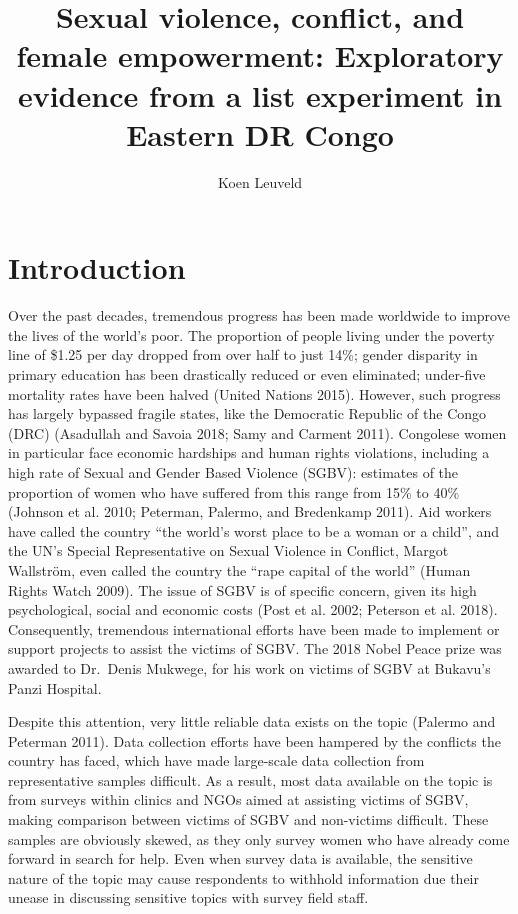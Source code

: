 \documentclass[
]{article}
\title{Sexual violence, conflict, and female empowerment: Exploratory
evidence from a list experiment in Eastern DR Congo}
\author{Koen Leuveld}
\date{}
\begin{document}
\maketitle

\section*{Introduction}\label{introduction}

Over the past decades, tremendous progress has been made worldwide to
improve the lives of the world's poor. The proportion of people living
under the poverty line of \$1.25 per day dropped from over half to just
14\%; gender disparity in primary education has been drastically reduced
or even eliminated; under-five mortality rates have been halved (United
Nations 2015). However, such progress has largely bypassed fragile
states, like the Democratic Republic of the Congo (DRC) (Asadullah and
Savoia 2018; Samy and Carment 2011). Congolese women in particular face
economic hardships and human rights violations, including a high rate of
Sexual and Gender Based Violence (SGBV): estimates of the proportion of
women who have suffered from this range from 15\% to 40\% (Johnson et
al. 2010; Peterman, Palermo, and Bredenkamp 2011). Aid workers have
called the country ``the world's worst place to be a woman or a child'',
and the UN's Special Representative on Sexual Violence in Conflict,
Margot Wallström, even called the country the ``rape capital of the
world'' (Human Rights Watch 2009). The issue of SGBV is of specific
concern, given its high psychological, social and economic costs (Post
et al. 2002; Peterson et al. 2018). Consequently, tremendous
international efforts have been made to implement or support projects to
assist the victims of SGBV. The 2018 Nobel Peace prize was awarded to
Dr.~Denis Mukwege, for his work on victims of SGBV at Bukavu's Panzi
Hospital.

Despite this attention, very little reliable data exists on the topic
(Palermo and Peterman 2011). Data collection efforts have been hampered
by the conflicts the country has faced, which have made large-scale data
collection from representative samples difficult. As a result, most data
available on the topic is from surveys within clinics and NGOs aimed at
assisting victims of SGBV, making comparison between victims of SGBV and
non-victims difficult. These samples are obviously skewed, as they only
survey women who have already come forward in search for help. Even when
survey data is available, the sensitive nature of the topic may cause
respondents to withhold information due their unease in discussing
sensitive topics with survey field staff.
\end{document}
